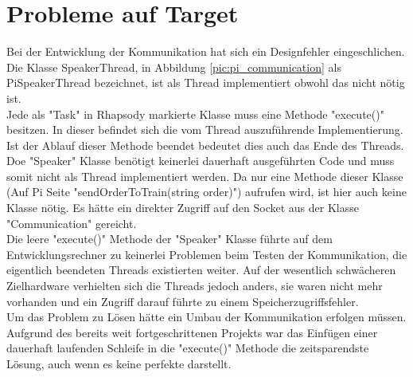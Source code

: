 \section{Probleme auf Target}

Bei der Entwicklung der Kommunikation hat sich ein Designfehler eingeschlichen. Die Klasse SpeakerThread, in Abbildung \ref{pic:pi_communication} als PiSpeakerThread bezeichnet, ist als Thread implementiert obwohl das nicht nötig ist.\\
Jede als "Task" in Rhapsody markierte Klasse muss eine Methode "execute()" besitzen. In dieser befindet sich die vom Thread auszuführende Implementierung. Ist der Ablauf dieser Methode beendet bedeutet dies auch das Ende des Threads.\\
Doe "Speaker" Klasse benötigt keinerlei dauerhaft ausgeführten Code und muss somit nicht als Thread implementiert werden. Da nur eine Methode dieser Klasse (Auf Pi Seite "sendOrderToTrain(string order)") aufrufen wird, ist hier auch keine Klasse nötig. Es hätte ein direkter Zugriff auf den Socket aus der Klasse "Communication" gereicht.\\
Die leere "execute()" Methode der "Speaker" Klasse führte auf dem Entwicklungsrechner zu keinerlei Problemen beim Testen der Kommunikation, die eigentlich beendeten Threads existierten weiter. Auf der wesentlich schwächeren Zielhardware verhielten sich die Threads jedoch anders, sie waren nicht mehr vorhanden und ein Zugriff darauf führte zu einem Speicherzugriffsfehler.\\
Um das Problem zu Lösen hätte ein Umbau der Kommunikation erfolgen müssen. Aufgrund des bereits weit fortgeschrittenen Projekts war das Einfügen einer dauerhaft laufenden Schleife in die "execute()" Methode die zeitsparendste Lösung, auch wenn es keine perfekte darstellt.